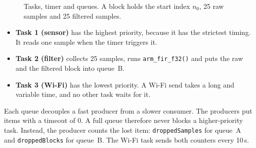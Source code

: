 \documentclass[11pt,a4paper]{article}
\begin{document}
\begin{figure}[h]
\centering
{}
\caption{Tasks, timer and queues. A block holds the start index $n_0$, 25 raw
         samples and 25 filtered samples.}
\label{fig:design}
\end{figure}

\begin{itemize}
  \item \textbf{Task 1 (sensor)} has the highest priority, because it has the
        strictest timing. It reads one sample when the timer triggers it.
  \item \textbf{Task 2 (filter)} collects 25 samples, runs
        \texttt{arm\_fir\_f32()} and puts the raw and the filtered block into
        queue~B.
  \item \textbf{Task 3 (Wi-Fi)} has the lowest priority. A Wi-Fi send takes a
        long and variable time, and no other task waits for it.
\end{itemize}

Each queue decouples a fast producer from a slower consumer. The producers put
items with a timeout of 0. A full queue therefore never blocks a
higher-priority task. Instead, the producer counts the lost item:
\texttt{droppedSamples} for queue~A and \texttt{droppedBlocks} for queue~B.
The Wi-Fi task sends both counters every 10\,s.
\end{document}
